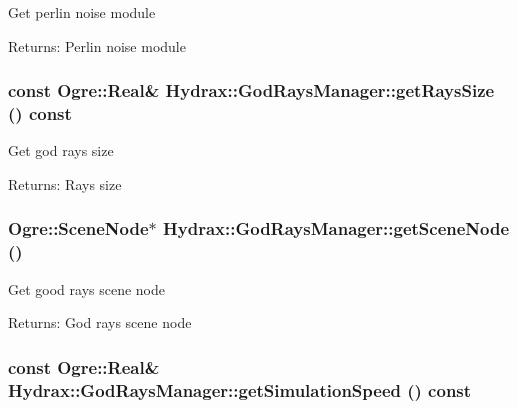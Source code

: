 \begin{CompactItemize}
Get perlin noise module \begin{Desc}
\item[Returns:]Perlin noise module \end{Desc}
\hypertarget{class_hydrax_1_1_god_rays_manager_80a4d001a4fd540a73cdbded89660c8d}{
\subsubsection[{getRaysSize}]{\setlength{\rightskip}{0pt plus 5cm}const Ogre::Real\& Hydrax::GodRaysManager::getRaysSize () const}}
\label{class_hydrax_1_1_god_rays_manager_80a4d001a4fd540a73cdbded89660c8d}


Get god rays size \begin{Desc}
\item[Returns:]Rays size \end{Desc}
\hypertarget{class_hydrax_1_1_god_rays_manager_9b94205d807dc98568fe5161a0bbc6d7}{
\subsubsection[{getSceneNode}]{\setlength{\rightskip}{0pt plus 5cm}Ogre::SceneNode$\ast$ Hydrax::GodRaysManager::getSceneNode ()}}
\label{class_hydrax_1_1_god_rays_manager_9b94205d807dc98568fe5161a0bbc6d7}


Get good rays scene node \begin{Desc}
\item[Returns:]God rays scene node \end{Desc}
\hypertarget{class_hydrax_1_1_god_rays_manager_707a5affb30167956b5d7d0696633ac2}{
\subsubsection[{getSimulationSpeed}]{\setlength{\rightskip}{0pt plus 5cm}const Ogre::Real\& Hydrax::GodRaysManager::getSimulationSpeed () const}}
\label{class_hydrax_1_1_god_rays_manager_707a5affb30167956b5d7d0696633ac2}



\end{CompactItemize}
